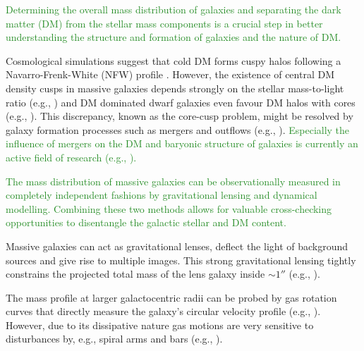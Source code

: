 \documentclass[useAMS,usenatbib]{mnras}
\newcommand{\NEW}[1]{\textcolor{ForestGreen}{#1}}
\newcommand{\OLD}[1]{}
\begin{document}
\NEW{Determining the overall mass distribution of galaxies and separating the dark matter (DM) from the stellar mass components is a crucial step in better understanding the structure and formation of galaxies and the nature of DM.}

\OLD{Gravitational lensing and dynamical modelling provide independent constraints on the mass distribution of galaxies. Combining them allows for valuable cross-checking opportunities to disentangle the galactic stellar and dark matter (DM) content.}

Cosmological simulations suggest that cold DM forms cuspy halos following a Navarro-Frenk-White (NFW) profile \citep{1996ApJ...462..563N}. However, the existence of central DM density cusps in massive galaxies depends strongly on the stellar mass-to-light ratio (e.g., \citealt{2011MNRAS.416..322D}) and DM dominated dwarf galaxies even favour DM halos with cores (e.g., \citealt{1994Natur.370..629M,2001ApJ...552L..23D}). This discrepancy, known as the core-cusp problem, might be resolved by galaxy formation processes such as mergers and outflows (e.g., \citealt{2001ApJ...560..636E,2012MNRAS.421.3464P}). \NEW{Especially the influence of mergers on the DM and baryonic structure of galaxies is currently an active field of research (e.g., \citealt{2009ApJ...697L..38J,2010ApJ...712...88L,2012MNRAS.425.3119H,2015MNRAS.453.2447D}).}

\OLD{Determining the overall mass distribution in massive galaxies and separating the DM from the stellar mass components is therefore a crucial step in better understanding the structure and formation of galaxies and nature of DM.}

\NEW{The mass distribution of massive galaxies can be observationally measured in completely independent fashions by gravitational lensing and dynamical modelling. Combining these two methods allows for valuable cross-checking opportunities to disentangle the galactic stellar and DM content.}

Massive galaxies can act as gravitational lenses, deflect the light of background sources and give rise to multiple images. This strong gravitational lensing tightly constrains the projected total mass of the lens galaxy inside $\sim 1''$ (e.g., \citealt{2010ARA&A..48...87T}). 

The mass profile at larger galactocentric radii can be probed by gas rotation curves that directly measure the galaxy's circular velocity profile (e.g., \citealt{1980ApJ...238..471R}). However, due to its dissipative nature gas motions are very sensitive to disturbances by, e.g., spiral arms and bars (e.g., \citealt{2004dad..book.....S}). 
\end{document}
